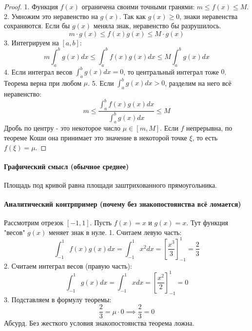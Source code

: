\begin{proof}
1. Функция $f(x)$ ограничена своими точными гранями: $m \le f(x) \le M$.
2. Умножим это неравенство на $g(x)$. Так как $g(x) \ge 0$, знаки неравенства сохраняются. Если бы $g(x)$ меняла знак, неравенство бы разрушилось.
$$ m \cdot g(x) \le f(x)g(x) \le M \cdot g(x) $$
3. Интегрируем на $[a, b]$:
$$ m \int_a^b g(x)dx \le \int_a^b f(x)g(x)dx \le M \int_a^b g(x)dx $$
4. Если интеграл весов $\int_a^b g(x)dx = 0$, то центральный интеграл тоже $0$. Теорема верна при любом $\mu$. 
5. Если $\int_a^b g(x)dx > 0$, разделим на него всё неравенство:
$$ m \le \frac{\int_a^b f(x)g(x)dx}{\int_a^b g(x)dx} \le M $$
Дробь по центру - это некоторое число $\mu \in [m, M]$. Если $f$ непрерывна, по теореме Коши она принимает это значение в некоторой точке $\xi$, то есть $f(\xi) = \mu$.
\end{proof}

\paragraph{Графический смысл (обычное среднее)}
Площадь под кривой равна площади заштрихованного прямоугольника.
\begin{center}
\end{center}

\paragraph{Аналитический контрпример (почему без знакопостоянства всё ломается)}
Рассмотрим отрезок $[-1, 1]$. Пусть $f(x) = x$ и $g(x) = x$. 
Тут функция "весов" $g(x)$ меняет знак в нуле.
1. Считаем левую часть:
$$ \int_{-1}^{1} f(x)g(x)dx = \int_{-1}^{1} x^2 dx = \left[ \frac{x^3}{3} \right]_{-1}^{1} = \frac{2}{3} $$
2. Считаем интеграл весов (правую часть):
$$ \int_{-1}^{1} g(x)dx = \int_{-1}^{1} x dx = \left[ \frac{x^2}{2} \right]_{-1}^{1} = 0 $$
3. Подставляем в формулу теоремы:
$$ \frac{2}{3} = \mu \cdot 0 \implies \frac{2}{3} = 0 $$
Абсурд. Без жесткого условия знакопостоянства теорема ложна.


